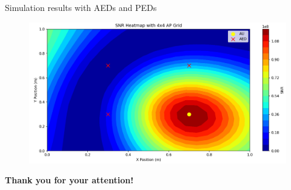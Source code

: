 \documentclass[aspectratio=169,xcolor=dvipsnames]{beamer}
\begin{document}
	\begin{frame}{Simulation results with AEDs and PEDs}
		\begin{figure}[h!]
			\centering
			\includegraphics[width=.6\textwidth]{../../simu3.PNG}
		\end{figure}
	\end{frame}
	
	\begin{frame}
		\Huge{\centerline{\textbf{Thank you for your attention!}}}
	\end{frame}
	
\end{document}

